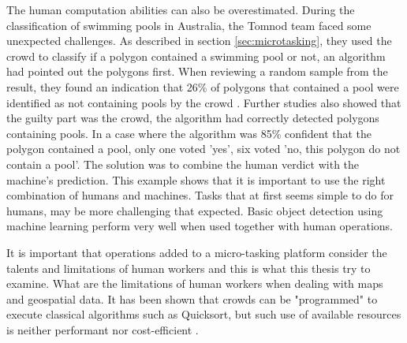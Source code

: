 The human computation abilities can also be overestimated. During the classification of swimming pools in Australia, the Tomnod team faced some unexpected challenges. As described in section \ref{sec:microtasking}, they used the crowd to classify if a polygon contained a swimming pool or not, an algorithm had pointed out the polygons first. When reviewing a random sample from the result, they found an indication that 26\% of polygons that contained a pool were identified as not containing pools by the crowd \citep{Kostas2016}.  Further studies also showed that the guilty part was the crowd, the algorithm had correctly detected polygons containing pools. In a case where the algorithm was 85\% confident that the polygon contained a pool, only one voted 'yes', six voted 'no, this polygon do not contain a pool'. The solution was to combine the human verdict with the machine's prediction. This example shows that it is important to use the right combination of humans and machines. Tasks that at first seems simple to do for humans, may be more challenging that expected.  Basic object detection using machine learning perform very well when used together with human operations. 

It is important that operations added to a micro-tasking platform consider the talents and limitations of human workers \citep{Franklin2011} and this is what this thesis try to examine. What are the limitations of human workers when dealing with maps and geospatial data. It has been shown that crowds can be "programmed" to execute classical algorithms such as Quicksort, but such use of available resources is neither performant nor cost-efficient \citep{Franklin2011}. 

